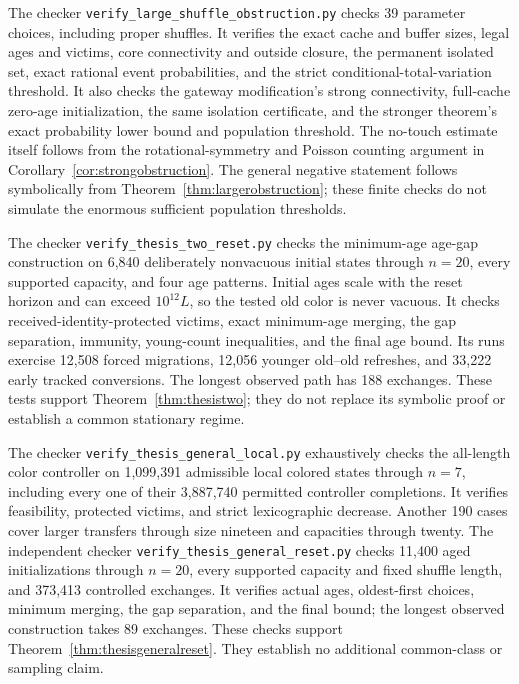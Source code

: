 \documentclass[11pt]{article}
\begin{document}
The checker \texttt{verify\_large\_shuffle\_obstruction.py}
checks 39 parameter choices, including proper shuffles.
It verifies the exact cache and buffer sizes, legal ages and
victims, core connectivity and outside closure, the permanent
isolated set, exact rational event probabilities, and the
strict conditional-total-variation threshold.
It also checks the gateway modification's strong connectivity,
full-cache zero-age initialization, the same isolation
certificate, and the stronger theorem's exact probability
lower bound and population threshold. The no-touch estimate
itself follows from the rotational-symmetry and Poisson
counting argument in Corollary~\ref{cor:strongobstruction}.
The general negative statement follows symbolically from
Theorem~\ref{thm:largerobstruction}; these finite checks do not
simulate the enormous sufficient population thresholds.

The checker \texttt{verify\_thesis\_two\_reset.py} checks the
minimum-age age-gap construction on 6,840 deliberately
nonvacuous initial states through $n=20$, every supported
capacity, and four age patterns. Initial ages scale with the
reset horizon and can exceed $10^{12}L$, so the tested old
color is never vacuous. It checks received-identity-protected
victims, exact minimum-age merging, the gap separation,
immunity, young-count inequalities, and the final age bound.
Its runs exercise 12,508 forced migrations, 12,056 younger
old--old refreshes, and 33,222 early tracked conversions.
The longest observed path has 188 exchanges. These tests
support Theorem~\ref{thm:thesistwo}; they do not replace its
symbolic proof or establish a common stationary regime.

The checker \texttt{verify\_thesis\_general\_local.py}
exhaustively checks the all-length color controller on
1,099,391 admissible local colored states through $n=7$,
including every one of their 3,887,740 permitted controller
completions. It verifies feasibility, protected victims,
and strict lexicographic decrease. Another 190 cases cover
larger transfers through size nineteen and capacities
through twenty.
The independent checker
\texttt{verify\_thesis\_general\_reset.py} checks 11,400
aged initializations through $n=20$, every supported
capacity and fixed shuffle length, and 373,413 controlled
exchanges. It verifies actual ages, oldest-first choices,
minimum merging, the gap separation, and the final bound;
the longest observed construction takes 89 exchanges.
These checks support Theorem~\ref{thm:thesisgeneralreset}.
They establish no additional common-class or sampling claim.
\end{document}
